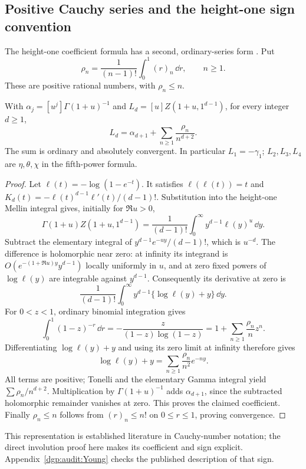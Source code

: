 \subsection{Positive Cauchy series and the height-one sign convention}
The height-one coefficient formula has a second, ordinary-series form
\cite{dgp:Young}. Put
\[
 \rho_n=\frac1{(n-1)!}\int_0^1(r)_n\,\dd r,\qquad n\ge1.
\]
These are positive rational numbers, with $\rho_n\le n$.
\begin{proposition}
\label{dgp:powers:prop:Cauchy}
With $\alpha_j=[u^j]\Gamma(1+u)^{-1}$ and
$L_d=[u]Z(1+u,1^{d-1})$, for every integer $d\ge1$,
\begin{equation}\label{dgp:powers:eq:Cauchy}
 L_d=\alpha_{d+1}+\sum_{n\ge1}\frac{\rho_n}{n^{d+2}}.
\end{equation}
The sum is ordinary and absolutely convergent. In particular $L_1=-\gamma_1$;
$L_2,L_3,L_4$ are $\eta,\theta,\chi$ in the fifth-power formula.
\end{proposition}
\begin{proof}
Let $\ell(t)=-\log(1-e^{-t})$. It satisfies $\ell(\ell(t))=t$ and
$K_d(t)=-\ell(t)^{d-1}\ell'(t)/(d-1)!$. Substitution into the
height-one Mellin integral gives, initially for $\Re u>0$,
\[
 \Gamma(1+u)Z(1+u,1^{d-1})
 =\frac1{(d-1)!}\int_0^\infty y^{d-1}\ell(y)^u\,\dd y.
\]
Subtract the elementary integral of $y^{d-1}e^{-uy}/(d-1)!$, which is
$u^{-d}$. The difference is holomorphic near zero: at infinity its
integrand is $O(e^{-(1+\Re u)y}y^{d-1})$ locally uniformly in $u$,
and at zero fixed powers of $\log\ell(y)$ are integrable against
$y^{d-1}$. Consequently its derivative at zero is
\[
 \frac1{(d-1)!}\int_0^\infty
       y^{d-1}\{\log\ell(y)+y\}\,\dd y.
\]
For $0<z<1$, ordinary binomial integration gives
\[
 \int_0^1(1-z)^{-r}\,\dd r
 =-\frac{z}{(1-z)\log(1-z)}
 =1+\sum_{n\ge1}\frac{\rho_n}{n}z^n.
\]
Differentiating $\log\ell(y)+y$ and using its zero limit at infinity
therefore gives
\[
 \log\ell(y)+y=\sum_{n\ge1}\frac{\rho_n}{n^2}e^{-ny}.
\]
All terms are positive; Tonelli and the elementary Gamma integral yield
$\sum\rho_n/n^{d+2}$. Multiplication by $\Gamma(1+u)^{-1}$ adds
$\alpha_{d+1}$, since the subtracted holomorphic remainder vanishes
at zero. This proves the claimed coefficient. Finally $\rho_n\le n$
follows from $(r)_n\le n!$ on $0\le r\le1$, proving convergence.
\end{proof}
This representation is established literature in Cauchy-number notation;
the direct involution proof here makes its coefficient and sign explicit.
Appendix~\ref{dgp:audit:Young} checks the published description of that sign.

